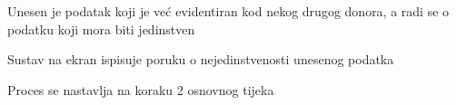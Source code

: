 \begin{packed_item}
\begin{packed_item}
							\item[4.b] Unesen je podatak koji je već evidentiran kod nekog drugog donora, a radi se o podatku koji mora biti jedinstven
							\begin{packed_enum}
								\item Sustav na ekran ispisuje poruku o nejedinstvenosti unesenog podatka
								\item Proces se nastavlja na koraku 2 osnovnog tijeka
							\end{packed_enum}
							
						\end{packed_item}
						
					\end{packed_item}
					
					\noindent {}
